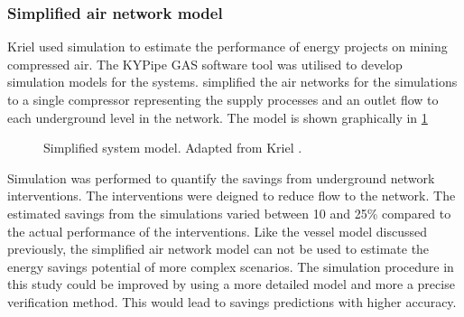 \subsubsection{Simplified air network model}
Kriel \cite{Kriel2014Masters} used simulation to estimate the performance of energy projects on mining compressed air. The KYPipe GAS software tool was utilised to develop simulation models for the systems. \cite{Kriel2014Masters} simplified the air networks for the simulations to a single compressor representing the supply processes and an outlet flow to each underground level in the network. The model is shown graphically in \cref{fig:kriel  model}
\begin{figure}[h!]
	\centering
	\caption[Simplified system model.]{Simplified system model. Adapted from Kriel \cite{Kriel2014Masters}.}
	\label{fig:kriel  model}
\end{figure}
\par 
Simulation was performed to quantify the savings from underground network interventions. The interventions were deigned to reduce flow to the network. The estimated savings from the simulations varied between 10 and 25\% compared to the actual performance of the interventions. Like the vessel model discussed previously, the simplified air network model can not be used to estimate the energy savings potential of more complex scenarios. The simulation procedure in this study could be improved by using a more detailed model and more a precise verification method. This would lead to savings predictions with higher accuracy. 
\par 
